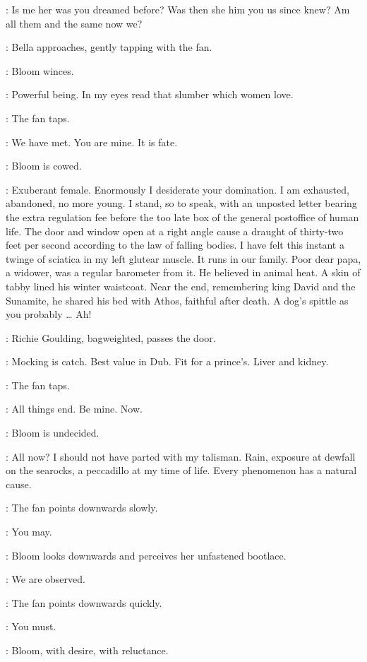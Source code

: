 \Fan:
Is me her was you dreamed before?
Was then she him you us since knew?
Am all them and the same now we?

:
Bella approaches,
gently tapping with the fan.

:
Bloom winces.

\Bloom:
Powerful being.
In my eyes read that slumber which women love.

:
The fan taps.

\Fan:
We have met.
You are mine.
It is fate.

:
Bloom is cowed.

\Bloom:
Exuberant female.
Enormously I desiderate your domination.
I am exhausted, abandoned, no more young.
I stand, so to speak, with an unposted letter
bearing the extra regulation fee
before the too late box of the general postoffice of human life.
The door and window open at a right angle
cause a draught of thirty-two feet per second
according to the law of falling bodies.
I have felt this instant a twinge of sciatica in my left glutear muscle.
It runs in our family.
Poor dear papa, a widower, was a regular barometer from it.
He believed in animal heat.
A skin of tabby lined his winter waistcoat.
Near the end, remembering king David and the Sunamite,
he shared his bed with Athos, faithful after death.
A dog's spittle as you probably \ldots
{}
Ah!

:
Richie Goulding, bagweighted, passes the door.

\Richie:
Mocking is catch.
Best value in Dub.
Fit for a prince's.
Liver and kidney.

:
The fan taps.

\Fan:
All things end.
Be mine.
Now.

:
Bloom is undecided.

\Bloom:
All now?
I should not have parted with my talisman.
Rain, exposure at dewfall on the searocks, a peccadillo at my time of life.
Every phenomenon has a natural cause.

:
The fan points downwards slowly.

\Fan:
You may.

:
Bloom looks downwards and perceives her unfastened bootlace.

\Bloom:
We are observed.

:
The fan points downwards quickly.

\Fan:
You must.

:
Bloom, with desire, with reluctance.

